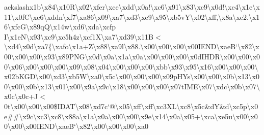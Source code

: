 \begin{DoxyCompactItemize}
ackslash{}x1b\textbackslash{}x84\textbackslash{}x10\+R\textbackslash{}x02\textbackslash{}xfer\textbackslash{}xce\textbackslash{}xdd\textbackslash{}x0a!\textbackslash{}xc6\textbackslash{}x91\textbackslash{}x83\textbackslash{}xc9\textbackslash{}x0d!\textbackslash{}xe4\textbackslash{}x1e\textbackslash{}x11\textbackslash{}x0f\+C\textbackslash{}xe6\textbackslash{}xddn\textbackslash{}xf7\textbackslash{}xa86\textbackslash{}x09\textbackslash{}xa7\textbackslash{}xd3\textbackslash{}xe9\textbackslash{}x95\textbackslash{}xb5v\+Y\textbackslash{}x02\textbackslash{}xff,\textbackslash{}x8a\textbackslash{}xe2.\textbackslash{}x16\textbackslash{}xfc\+G\textbackslash{}x89q\+Q\textbackslash{}x14w\textbackslash{}xd6\textbackslash{}xda\textbackslash{}xcfp I\textbackslash{}x1e\+N\textquotesingle{}\textbackslash{}x93\textbackslash{}xc9\textbackslash{}xc5h4z\textbackslash{}xcf1\+X\textbackslash{}xa7\textbackslash{}xd39\textbackslash{}x11\+B$<$\textbackslash{}xd4\textbackslash{}x0d\textbackslash{}xa7\{\textbackslash{}xafo\textbackslash{}x1a+\+Z\textbackslash{}x88\textbackslash{}xa9l\textbackslash{}x88.\textbackslash{}x00\textbackslash{}x00\textbackslash{}x00\textbackslash{}x00\+I\+E\+N\+D\textbackslash{}xae\+B`\textbackslash{}x82\textbackslash{}x00\textbackslash{}x00\textbackslash{}x00\textbackslash{}x93\textbackslash{}x89\+P\+N\+G\textbackslash{}x0d\textbackslash{}x0a\textbackslash{}x1a\textbackslash{}x0a\textbackslash{}x00\textbackslash{}x00\textbackslash{}x00\textbackslash{}x0d\+I\+H\+D\+R\textbackslash{}x00\textbackslash{}x00\textbackslash{}x00\textbackslash{}x06\textbackslash{}x00\textbackslash{}x00\textbackslash{}x00\textbackslash{}x09\textbackslash{}x08\textbackslash{}x04\textbackslash{}x00\textbackslash{}x00\textbackslash{}x00\textbackslash{}xbb\textbackslash{}x93\textbackslash{}x95\textbackslash{}x16\textbackslash{}x00\textbackslash{}x00\textbackslash{}x00\textbackslash{}x02b\+K\+G\+D\textbackslash{}x00\textbackslash{}xd3\textbackslash{}xb5\+W\textbackslash{}xa0\textbackslash{}x5c\textbackslash{}x00\textbackslash{}x00\textbackslash{}x00\textbackslash{}x09p\+H\+Ys\textbackslash{}x00\textbackslash{}x00\textbackslash{}x0b\textbackslash{}x13\textbackslash{}x00\textbackslash{}x00\textbackslash{}x0b\textbackslash{}x13\textbackslash{}x01\textbackslash{}x00\textbackslash{}x9a\textbackslash{}x9c\textbackslash{}x18\textbackslash{}x00\textbackslash{}x00\textbackslash{}x00\textbackslash{}x07t\+I\+M\+E\textbackslash{}x07\textbackslash{}xdc\textbackslash{}x0b\textbackslash{}x07\textbackslash{}x0c\textbackslash{}x0c+\+J$<$0t\textbackslash{}x00\textbackslash{}x00\textbackslash{}x00\$\+I\+D\+A\+T\textbackslash{}x08\textbackslash{}xd7c`@\textbackslash{}x05\textbackslash{}xff\textbackslash{}xff\textbackslash{}xc3\+X\+L\textbackslash{}xc8\textbackslash{}x5c\&d\+Y\&d\textbackslash{}xc5p\textbackslash{}x0e\#\#\textbackslash{}x9c\textbackslash{}xc3\textbackslash{}xc8\textbackslash{}x88a\textbackslash{}x1a\textbackslash{}x0a\textbackslash{}x00\textbackslash{}x00\textbackslash{}x9e\textbackslash{}x14\textbackslash{}x0a\textbackslash{}x05+\textbackslash{}xca\textbackslash{}xe5u\textbackslash{}x00\textbackslash{}x00\textbackslash{}x00\textbackslash{}x00\+I\+E\+N\+D\textbackslash{}xae\+B`\textbackslash{}x82\textbackslash{}x00\textbackslash{}x00\textbackslash{}x00\textbackslash{}xa0\textbackslas
\end{DoxyCompactItemize}
